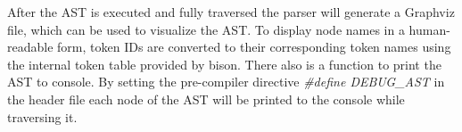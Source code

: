 After the AST is executed and fully traversed the parser will generate a
Graphviz file, which can be used to visualize the AST. To display node names 
in a human-readable form, token IDs are converted to their corresponding
token names using the internal token table provided by bison.
There also is a function to print the AST to console.\newline
By setting the pre-compiler directive \textit{\#define DEBUG\_AST} in the header file
each node of the AST will be printed to the console while traversing it.